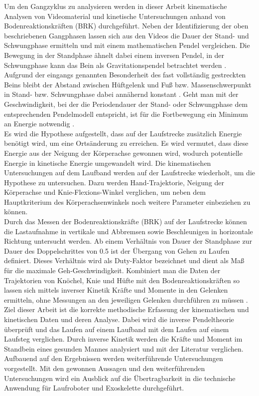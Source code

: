 Um den Gangzyklus zu analysieren werden in dieser Arbeit kinematische Analysen von Videomaterial und kinetische Untersuchungen anhand von Bodenreaktionskräften (BRK) durchgeführt. Neben der Identifizierung der oben beschriebenen Gangphasen lassen sich aus den Videos die Dauer der Stand- und Schwungphase ermitteln und mit einem mathematischen Pendel vergleichen. Die Bewegung in der Standphase ähnelt dabei einem inversen Pendel, in der Schwungphase kann das Bein als Gravitationspendel betrachtet werden \parencite{mochon1980ballistic}. Aufgrund der eingangs genannten Besonderheit des fast vollständig gestreckten Beins bleibt der Abstand zwischen Hüftgelenk und Fuß bzw. Massenschwerpunkt in Stand- bzw. Schwungphase dabei annähernd konstant \parencite{witte1992mechanische}. Geht man mit der Geschwindigkeit, bei der die Periodendauer der Stand- oder Schwungphase dem entsprechenden Pendelmodell entspricht, ist für die Fortbewegung ein Minimum an Energie notwendig \parencite{kuo2007six}.\\
Es wird die Hypothese aufgestellt, dass auf der Laufstrecke zusätzlich Energie benötigt wird, um eine Ortsänderung zu erreichen. Es wird vermutet, dass diese Energie aus der Neigung der Körperachse gewonnen wird, wodurch potentielle Energie in kinetische Energie umgewandelt wird. Die kinematischen Untersuchungen auf dem Laufband werden auf der Laufstrecke wiederholt, um die Hypothese zu untersuchen. Dazu werden Hand-Trajektorie, Neigung der Körperachse und Knie-Flexions-Winkel verglichen, um neben dem Hauptkriterium des Körperachsenwinkels noch weitere Parameter einbeziehen zu können.\\
Durch das Messen der Bodenreaktionskräfte (BRK) auf der Laufstrecke können die Lastaufnahme in vertikale und Abbremsen sowie Beschleunigen in horizontale Richtung untersucht werden. Ab einem Verhältnis von Dauer der Standphase zur Dauer des Doppelschrittes von 0.5 ist der Übergang von Gehen zu Laufen definiert. Dieses Verhältnis wird als Duty-Faktor bezeichnet und dient als Maß für die maximale Geh-Geschwindigkeit. Kombiniert man die Daten der Trajektorien von Knöchel, Knie und Hüfte mit den Bodenreaktionskräften so lassen sich mittels inverser Kinetik Kräfte und Momente in den Gelenken ermitteln, ohne Messungen an den jeweiligen Gelenken durchführen zu müssen \parencite{winter2009biomechanics}.\\
Ziel dieser Arbeit ist die korrekte methodische Erfassung der kinematischen und kinetischen Daten und deren Analyse. Dabei wird die inverse Pendeltheorie überprüft und das Laufen auf einem Laufband mit dem Laufen auf einem Laufsteg verglichen. Durch inverse Kinetik werden die Kräfte und Moment im Standbein eines gesunden Mannes analysiert und mit der Literatur verglichen.\\
Aufbauend auf den Ergebnissen werden weiterführende Untersuchungen vorgestellt. Mit den gewonnen Aussagen und den weiterführenden Untersuchungen wird ein Ausblick auf die Übertragbarkeit in die technische Anwendung für Laufroboter und Exoskelette durchgeführt.